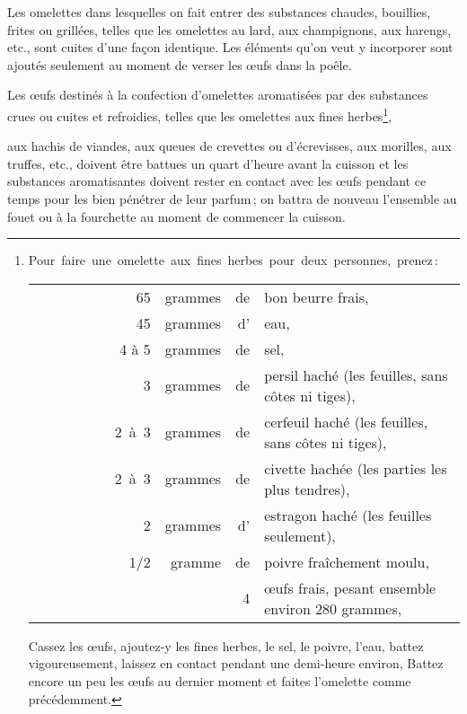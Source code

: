 \sk

Les omelettes dans lesquelles on fait entrer des substances chaudes, bouillies,
frites ou grillées, telles que les omelettes au lard, aux champignons, aux
harengs, etc., sont cuites d'une façon identique. Les éléments qu'on veut
y incorporer sont ajoutés seulement au moment de verser les œufs dans la poêle.

Les œufs destinés à la confection d'omelettes aromatisées par des substances
crues ou cuites et refroidies, telles que les omelettes aux fines 
herbes\footnote{Pour faire une omelette aux fines herbes pour deux personnes, prenez :
    \setlength\tabcolsep{.2em}
    \begin{tabular}{r r r l}
                  65 & grammes  & de & bon beurre frais,                                                 \\
                  45 & grammes  & d' & eau,                                                              \\
               4 à 5 & grammes  & de & sel,                                                              \\
                   3 & grammes  & de & persil haché (les feuilles, sans côtes ni tiges),                 \\
               2 à 3 & grammes  & de & cerfeuil haché (les feuilles, sans côtes ni tiges),               \\
               2 à 3 & grammes  & de & civette hachée (les parties les plus tendres),                    \\
                   2 & grammes  & d' & estragon haché (les feuilles seulement),                          \\
                 1/2 & gramme   & de & poivre fraîchement moulu,                                         \\
                     &          &  4 & œufs frais, pesant ensemble environ 280 grammes,                  \\
    \end{tabular}
    \medskip
    \protect\endgraf
    Cassez les œufs, ajoutez-y les fines herbes, le sel, le poivre, l'eau,
    battez vigoureusement, laissez en contact pendant une demi-heure environ,
    Battez encore un peu les œufs au dernier moment et faites l'omelette comme
    précédemment. },
    
aux hachis de viandes, aux queues de crevettes ou d'écrevisses, aux morilles,
aux truffes, etc., doivent être battues un quart d'heure avant la cuisson et
les substances aromatisantes doivent rester en contact avec les œufs pendant ce
temps pour les bien pénétrer de leur parfum ; on battra de nouveau l'ensemble
au fouet ou à la fourchette au moment de commencer la cuisson.

